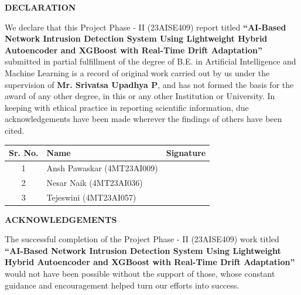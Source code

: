 \documentclass[12pt,a4paper]{report}
\begin{document}
\begin{center}
{\Large\bfseries DECLARATION}\\[0.8cm]
\end{center}

We declare that this Project Phase - II (23AISE409) report titled \textbf{``AI-Based Network Intrusion Detection System Using Lightweight Hybrid Autoencoder and XGBoost with Real-Time Drift Adaptation''} submitted in partial fulfillment of the degree of B.E. in Artificial Intelligence and Machine Learning is a record of original work carried out by us under the supervision of \textbf{Mr. Srivatsa Upadhya P}, and has not formed the basis for the award of any other degree, in this or any other Institution or University. In keeping with ethical practice in reporting scientific information, due acknowledgements have been made wherever the findings of others have been cited.\par\vspace{1.0cm}

\noindent
\begin{tabularx}{\textwidth}{|c|X|p{4.5cm}|}
\hline
\textbf{Sr. No.} & \textbf{\centering Name} & \textbf{\centering Signature} \\
\hline
1 & Ansh Pawaskar (4MT23AI009) & \\[0.6cm]
\hline
2 & Nesar Naik (4MT23AI036) & \\[0.6cm]
\hline
3 & Tejeswini (4MT23AI057) & \\[0.6cm]
\hline
\end{tabularx}

\clearpage
\thispagestyle{empty}


\begin{center}
{\Large\bfseries ACKNOWLEDGEMENTS}\\[0.6cm]
\end{center}

The successful completion of the Project Phase - II (23AISE409) work titled \textbf{``AI-Based Network Intrusion Detection System Using Lightweight Hybrid Autoencoder and XGBoost with Real-Time Drift Adaptation''} would not have been possible without the support of those, whose constant guidance and encouragement helped turn our efforts into success.
\end{document}
